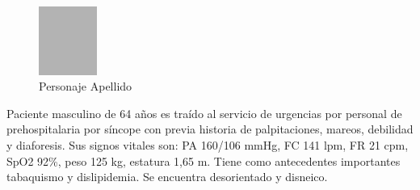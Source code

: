 \documentclass[a4paper]{article}
\date{\today}
\begin{document}
\maketitle

\begin{multicols}{3}



\lipsum[1-2]

\closearticle



\lipsum[3]

\begin{figure}
	\begin{center}
		\vspace{-10pt}
		\includegraphics[width=0.17\textwidth]{prueba.jpg}
	\end{center}
	\caption*{Personaje Apellido}
\end{figure}

\lipsum[4-5]

\closearticle



\lipsum[6]

\begin{boxClinica}

Paciente masculino de 64 años es traído al servicio de urgencias por personal
de prehospitalaria por síncope con previa historia de palpitaciones, mareos,
debilidad y diaforesis. Sus signos vitales son: PA 160/106 mmHg, FC 141 lpm,
FR 21 cpm, SpO2 92\%, peso 125 kg, estatura 1,65 m. Tiene como antecedentes
importantes tabaquismo y dislipidemia. Se encuentra desorientado y disneico.

\end{boxClinica}

\lipsum[8-12]

\end{multicols}

\closearticle

\begin{multicols}{3}

\printbibliography[heading=none]

\end{multicols}
\end{document}
